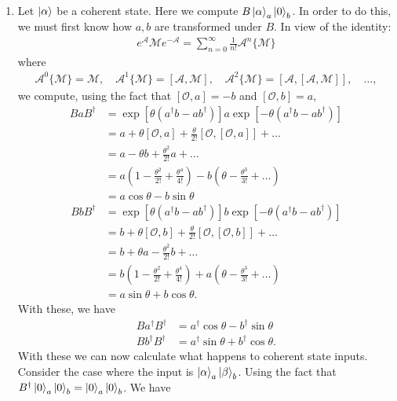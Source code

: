 \documentclass{article}
\theoremstyle{definition}
\newcommand{\al}{\alpha}
\newcommand{\be}{\beta}
\newcommand{\f}[2]{\frac{#1}{#2}}
\newcommand{\lp}{\left(}
\newcommand{\rp}{\right)}
\newcommand{\lb}{\left[}
\newcommand{\rb}{\right]}
\begin{document}
\begin{enumerate}[label=\alph*)]
\item Let $\ket{\al}$ be a coherent state. Here we compute $B \ket{\al}_a \ket{0}_b $. In order to do this, we must first know how $a,b$ are transformed under $B$. In view of the identity:
\begin{align*}
e^{\mathcal{A}}  \mathcal{M} e^{-\mathcal{A}} = \sum_{n=0}^\infty \f{1}{n!} \mathcal{A}^n \{ \mathcal{M} \}
\end{align*}
where 
\begin{align*}
\mathcal{A}^0 \{ \mathcal{M} \}= \mathcal{M}, \quad \mathcal{A}^1 \{ \mathcal{M} \} = [\mathcal{A}, \mathcal{M}], \quad \mathcal{A}^2 \{ \mathcal{M} \} = [\mathcal{A}, [\mathcal{A}, \mathcal{M}]], \quad \dots,
\end{align*}
we compute, using the fact that $[\mathcal{O},a] = -b$ and $[\mathcal{O},b] = a$,
\begin{align*}
B a B^\dagger 
&= \exp\lb \theta\lp a^\dagger b -ab^\dagger \rp \rb   a \exp\lb -\theta \lp a^\dagger b - ab^\dagger \rp \rb \\
&= a + \theta[ \mathcal{O},a] + \f{\theta}{2!}[\mathcal{O}, [\mathcal{O}, a]] + \dots \\
&= a - \theta b + \f{\theta^2}{2!} a + \dots \\
&= a\lp 1 - \f{\theta^2}{2!} + \f{\theta^4}{4!} \rp - b \lp \theta - \f{\theta^3}{3!} + \dots \rp \\
&= a\cos\theta - b\sin\theta
\end{align*}
\begin{align*}
B b B^\dagger 
&= \exp\lb \theta\lp a^\dagger b -ab^\dagger \rp \rb   b \exp\lb -\theta \lp a^\dagger b - ab^\dagger \rp \rb \\
&= b + \theta[ \mathcal{O},b] + \f{\theta}{2!}[\mathcal{O}, [\mathcal{O}, b]] + \dots \\
&= b + \theta a - \f{\theta^2}{2!} b + \dots \\
&= b\lp 1 - \f{\theta^2}{2!} + \f{\theta^4}{4!} \rp + a \lp \theta - \f{\theta^3}{3!} + \dots \rp \\
&= a\sin\theta + b\cos\theta.
\end{align*}
With these, we have
\begin{align*}
B a^\dagger B^\dagger &= a^\dagger \cos\theta - b^\dagger \sin\theta \\
B b^\dagger B^\dagger &= a^\dagger \sin\theta + b^\dagger \cos\theta.
\end{align*}
With these we can now calculate what happens to coherent state inputs. Consider the case where the input is $\ket{\al}_a \ket{\be}_b$. Using the fact that $B^\dagger \ket{0}_a\ket{0}_b = \ket{0}_a \ket{0}_b$. We have

\end{enumerate}
\end{document}
